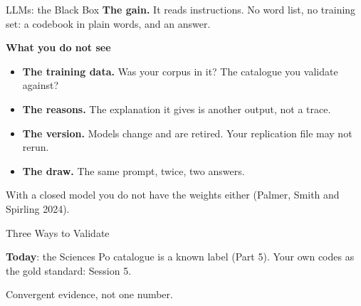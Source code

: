 \documentclass[svgnames,x11names,dvipsnames]{beamer}
\newcommand{\chg}[1]{{\bfseries #1}}
\renewcommand{\chg}[1]{#1}
\newcommand{\new}[1]{#1}
\begin{document}
\begin{frame}{\chg{LLMs: the Black Box}}
\small
\textbf{The gain.} It reads instructions. No word list, no training set: a codebook in plain words, and an answer.

\vspace{0.4cm}
\textbf{What you do not see}
\begin{itemize}
    \setlength{\itemsep}{4pt}
    \item \textbf{The training data.} Was your corpus in it? The catalogue you validate against?
    \item \textbf{The reasons.} The explanation it gives is another output, not a trace.
    \item \textbf{The version.} Models change and are retired. Your replication file may not rerun.
    \item \textbf{The draw.} The same prompt, twice, two answers.
\end{itemize}

\vspace{0.4cm}
With a closed model you do not have the weights either (Palmer, Smith and Spirling 2024).
\end{frame}

\begin{frame}{\new{Three Ways to Validate}}
\centering
{}

\vspace{0.4cm}
\raggedright
\small
\textbf{Today}: the Sciences Po catalogue is a known label (Part 5). Your own codes as the gold standard: Session 5.

\vspace{0.2cm}
\centering
\alert{Convergent evidence, not one number.}
\end{frame}
\end{document}
